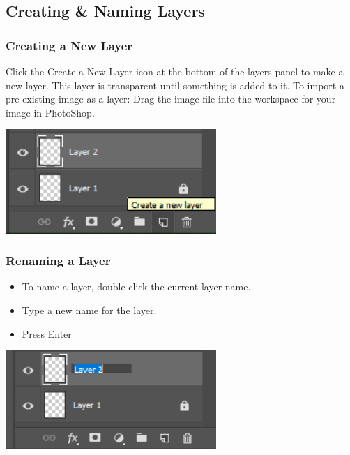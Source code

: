 \documentclass{beamer}
\begin{document}
	\subsection{Creating \& Naming Layers}		
\begin{frame}
	\frametitle{Creating a New Layer}
	\begin{outline}
		\1 Click the Create a New Layer icon at the bottom of the layers panel to make a new layer. 
		\2 This layer is transparent until something is added to it.
		\1 To import a pre-existing image as a layer: 
		\2 Drag the image file into the workspace for your image in PhotoShop.
	\end{outline}
	\begin{center}
		\includegraphics[width = 0.6\textwidth]{images/new layer.png}
	\end{center}
\end{frame}

\begin{frame}
	\frametitle{Renaming a Layer}
	\begin{itemize}
		\item To name a layer, double-click the current layer name. 
		\item Type a new name for the layer. 
		\item Press Enter
	\end{itemize}
	\begin{center}
		\includegraphics[width = 0.6\textwidth]{images/renaming a layer.png}
	\end{center}
\end{frame}
	
\end{document}
